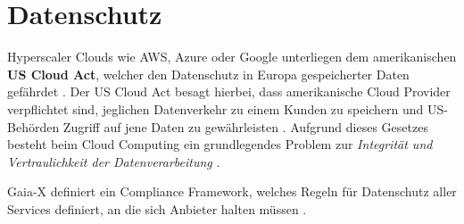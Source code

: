 \section{Datenschutz}
\label{sec:slas:datenschutz}
Hyperscaler Clouds wie \ac{AWS}, Azure oder Google unterliegen dem amerikanischen \textbf{US Cloud Act}, welcher
den Datenschutz in Europa gespeicherter Daten gefährdet \cite{Kagermann2021}. Der US Cloud Act besagt hierbei,
dass amerikanische Cloud Provider verpflichtet sind, jeglichen Datenverkehr zu einem Kunden zu speichern und 
US-Behörden Zugriff auf jene Daten zu gewährleisten \cite{CloudAct2018}.
Aufgrund dieses Gesetzes besteht beim Cloud Computing ein grundlegendes Problem 
zur \emph{Integrität und Vertraulichkeit der Datenverarbeitung} \cite{Weichert2010}.

Gaia-X definiert ein Compliance Framework, welches Regeln für Datenschutz aller Services definiert, an die sich
Anbieter halten müssen \cite{}. 